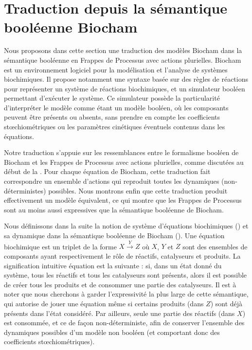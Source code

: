 
\section{Traduction depuis la sémantique booléenne Biocham}

Nous proposons dans cette section une traduction des modèles Biocham dans la sémantique booléenne
en Frappes de Processus avec actions plurielles.
Biocham 
est un environnement logiciel pour la modélisation et l'analyse de systèmes biochimiques.
Il propose notamment une syntaxe basée sur des règles de réactions pour représenter
un système de réactions biochimiques,
et un simulateur booléen permettant d'exécuter le système.
Ce simulateur possède la particularité d'interpréter le modèle comme étant un modèle booléen,
où les composants peuvent être présents ou absents,
sans prendre en compte les coefficients stœchiométriques ou les paramètres cinétiques
éventuels contenus dans les équations.

Notre traduction s'appuie sur les ressemblances entre le formalisme booléen de Biocham
et les Frappes de Processus avec actions plurielles, comme discutées au début de la
.
Pour chaque équation de Biocham, cette traduction fait correspondre
un ensemble d'actions qui reproduit toutes les dynamiques (non-déterministes) possibles.
Nous montrons enfin que cette traduction produit effectivement un modèle équivalent,
ce qui montre que les Frappes de Processus sont au moins aussi expressives
que la sémantique booléenne de Biocham.

\myskip

Nous définissons dans la suite la notion de système d'équations biochimiques ()
et sa dynamique dans la sémantique booléenne de Biocham ().
Une équation biochimique est un triplet de la forme $X \xrightarrow{Y} Z$
où $X$, $Y$ et $Z$ sont des ensembles de composants ayant respectivement le rôle
de réactifs, catalyseurs et produits.
La signification intuitive équation est la suivante :
si, dans un état donné du système, tous les réactifs et tous les catalyseurs sont présents,
alors il est possible de créer tous les produits et de consommer une partie des catalyseurs.
Il est à noter que nous cherchons à garder l'expressivité la plus large de cette sémantique,
qui autorise de jouer une équation même si certains produits (dans $Z$) sont déjà présents
dans l'état considéré.
Par ailleurs, seule une partie des réactifs (dans $X$) est consommée, et ce de façon
non-déterministe, afin de conserver l'ensemble des dynamiques possibles d'un modèle non booléen
(et comportant donc des coefficients stœchiométriques).

